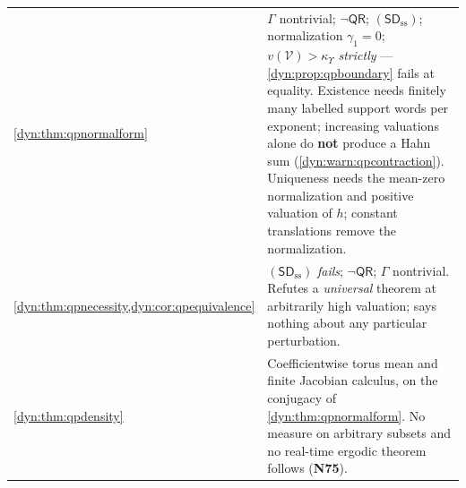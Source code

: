 \documentclass[11pt,letterpaper]{article}
\theoremstyle{definition}
\theoremstyle{remark}
\newcommand{\qres}{\mathsf{QR}}
\newcommand{\sdss}{\mathsf{SD}_{\mathrm{ss}}}
\newcommand{\kups}{\kappa_{\Upsilon}}
\numberwithin{equation}{section}
\begin{document}
\begin{longtable}{@{}P{0.26\textwidth}P{0.67\textwidth}@{}}
\cref{dyn:thm:qpnormalform} &
$\Gamma$ nontrivial; $\lnot\qres$; $(\sdss)$; normalization $\gamma_1=0$;
$v(\mathcal V)>\kups$ \emph{strictly} --- \cref{dyn:prop:qpboundary} fails
at equality. Existence needs finitely many labelled support words per
exponent; increasing valuations alone do \textbf{not} produce a Hahn sum
(\cref{dyn:warn:qpcontraction}). Uniqueness needs the mean-zero
normalization and positive valuation of $h$; constant translations remove
the normalization.\\[3pt]
\cref{dyn:thm:qpnecessity,dyn:cor:qpequivalence} &
$(\sdss)$ \emph{fails}; $\lnot\qres$; $\Gamma$ nontrivial. Refutes a
\emph{universal} theorem at arbitrarily high valuation; says nothing about
any particular perturbation.\\[3pt]
\cref{dyn:thm:qpdensity} &
Coefficientwise torus mean and finite Jacobian calculus, on the conjugacy
of \cref{dyn:thm:qpnormalform}. No measure on arbitrary subsets and no
real-time ergodic theorem follows (\textbf{N75}).\\
\bottomrule
\end{longtable}
\end{document}

